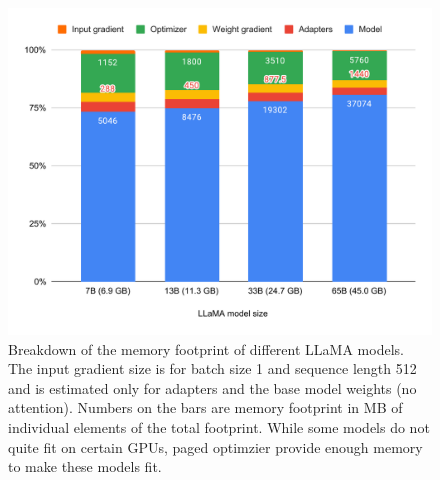 \documentclass{article}
\begin{document}
\begin{figure}[t]
     \centering
         \includegraphics[scale=0.48]{figures/mem.pdf}
        \caption{Breakdown of the memory footprint of different LLaMA models. The input gradient size is for batch size 1 and sequence length 512 and is estimated only for adapters and the base model weights (no attention). Numbers on the bars are memory footprint in MB of individual elements of the total footprint. While some models do not quite fit on certain GPUs, paged optimzier provide enough memory to make these models fit.}
        \label{fig:memory}
\end{figure} 
\end{document}
